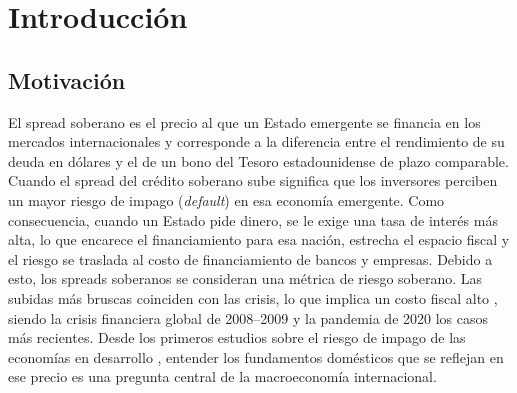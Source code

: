 \chapter{Introducción}
\label{sec:intro}

\section{Motivación}

El spread soberano es el precio al que un Estado emergente se financia en los mercados
internacionales y corresponde a la diferencia entre el rendimiento de su deuda en dólares y el de un
bono del Tesoro estadounidense de plazo comparable. Cuando el spread del crédito soberano sube
significa que los inversores perciben un mayor riesgo de impago (\textit{default}) en esa economía
emergente. Como consecuencia, cuando un Estado pide dinero, se le exige una tasa de interés más alta,
lo que encarece el financiamiento para esa nación, estrecha el espacio fiscal y el riesgo se traslada
al costo de financiamiento de bancos y empresas. Debido a esto, los spreads soberanos se consideran una
métrica de riesgo soberano. Las subidas más bruscas coinciden con las crisis, lo que implica un costo
fiscal alto \citep{ReinhartRogoff2009}, siendo la crisis financiera global de 2008--2009 y la pandemia
de 2020 los casos más recientes. Desde los primeros estudios sobre el riesgo de impago de las
economías en desarrollo \citep{Edwards1984}, entender los fundamentos domésticos que se reflejan en
ese precio es una pregunta central de la macroeconomía internacional.

